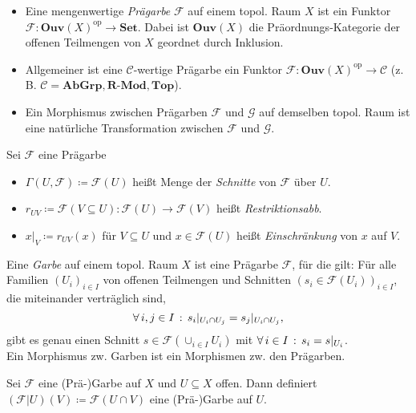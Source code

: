 \documentclass{cheat-sheet}
\newcommand{\SetC}{\mathbf{Set}} %
\newcommand{\Top}{\mathbf{Top}} %
\newcommand{\AbGrp}{\mathbf{AbGrp}} %
\newcommand{\RMod}{\mathbf{R\text{-}Mod}} %
\newcommand{\Ouv}{\mathbf{Ouv}} %
\newcommand{\op}{\mathrm{op}} %
\newcommand{\Fais}{\mathcal{F}} %
\newcommand{\Garb}{\mathcal{G}} %
\begin{document}


\begin{defn}
  \begin{itemize}
    \item Eine mengenwertige \emph{Prägarbe} $\Fais$ auf einem topol. Raum $X$ ist ein Funktor
    $\Fais : \Ouv(X)^\op \to \SetC$.
    Dabei ist $\Ouv(X)$ die Präordnungs-Kategorie der offenen Teilmengen von $X$ geordnet durch Inklusion.
    \item Allgemeiner ist eine $\mathcal{C}$-wertige Prägarbe ein Funktor $\Fais : \Ouv(X)^\op \to \mathcal{C}$ (z.\,B. $\mathcal{C} = \AbGrp, \RMod, \Top$).
    \item Ein Morphismus zwischen Prägarben $\Fais$ und $\Garb$ auf demselben topol. Raum ist eine natürliche Transformation zwischen $\Fais$ und $\Garb$.
  \end{itemize}
\end{defn}

\begin{nota}
  Sei $\Fais$ eine Prägarbe
  \begin{itemize}
    \item $\Gamma(U, \Fais) \coloneqq \Fais(U)$ heißt Menge der \emph{Schnitte} von $\Fais$ über $U$.
    \item $r_{UV} \coloneqq \Fais(V \subseteq U) : \Fais(U) \to \Fais(V)$ heißt \emph{Restriktionsabb}.
    \item $x|_V \coloneqq r_{UV}(x)$ für $V \subseteq U$ und $x \in \Fais(U)$ heißt \emph{Einschränkung} von $x$ auf $V$.
  \end{itemize}
\end{nota}

\begin{defn}
  Eine \emph{Garbe} auf einem topol. Raum $X$ ist eine Prägarbe $\Fais$, für die gilt:
  Für alle Familien $(U_i)_{i \in I}$ von offenen Teilmengen und Schnitten $(s_i \in \Fais(U_i))_{i \in I}$, die miteinander verträglich sind, \dh{}
  \[ \forall \, {i, j \in I} \,:\, s_i|_{U_i \cap U_j} = s_j|_{U_i \cap U_j}, \]
  gibt es genau einen Schnitt $s \in \Fais(\cup_{i \in I} U_i)$ mit $\forall \, {i \in I} \,:\, s_i = s|_{U_i}$.\\
  Ein Morphismus zw. Garben ist ein Morphismen zw. den Prägarben.
\end{defn}

\begin{bem}
  Sei $\Fais$ eine (Prä-)Garbe auf $X$ und $U \subseteq X$ offen. Dann definiert $(\Fais|U)(V) \coloneqq \Fais(U \cap V)$ eine (Prä-)Garbe auf $U$.
\end{bem}
\end{document}
